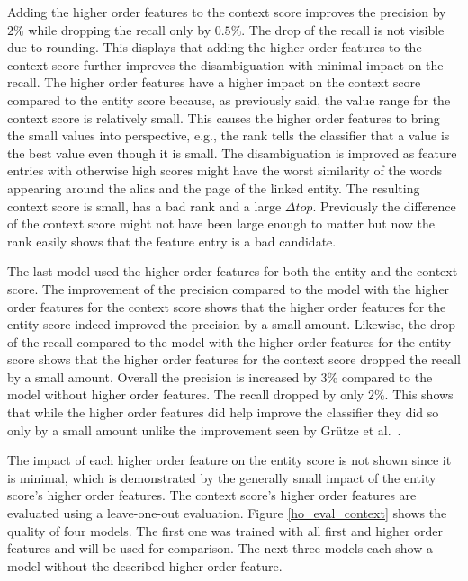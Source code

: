 Adding the higher order features to the context score improves the precision by $2\%$ while dropping the recall only by $0.5\%$. The drop of the recall is not visible due to rounding. This displays that adding the higher order features to the context score further improves the disambiguation with minimal impact on the recall. The higher order features have a higher impact on the context score compared to the entity score because, as previously said, the value range for the context score is relatively small. This causes the higher order features to bring the small values into perspective, e.g., the rank tells the classifier that a value is the best value even though it is small. The disambiguation is improved as feature entries with otherwise high scores might have the worst similarity of the words appearing around the alias and the page of the linked entity. The resulting context score is small, has a bad rank and a large $\Delta top$. Previously the difference of the context score might not have been large enough to matter but now the rank easily shows that the feature entry is a bad candidate.\par
The last model used the higher order features for both the entity and the context score. The improvement of the precision compared to the model with the higher order features for the context score shows that the higher order features for the entity score indeed improved the precision by a small amount. Likewise, the drop of the recall compared to the model with the higher order features for the entity score shows that the higher order features for the context score dropped the recall by a small amount. Overall the precision is increased by $3\%$ compared to the model without higher order features. The recall dropped by only $2\%$. This shows that while the higher order features did help improve the classifier they did so only by a small amount unlike the improvement seen by Grütze et al.\ \cite{coheel}.\par
The impact of each higher order feature on the entity score is not shown since it is minimal, which is demonstrated by the generally small impact of the entity score's higher order features. The context score's higher order features are evaluated using a leave-one-out evaluation. Figure \ref{ho_eval_context} shows the quality of four models. The first one was trained with all first and higher order features and will be used for comparison. The next three models each show a model without the described higher order feature.\par
